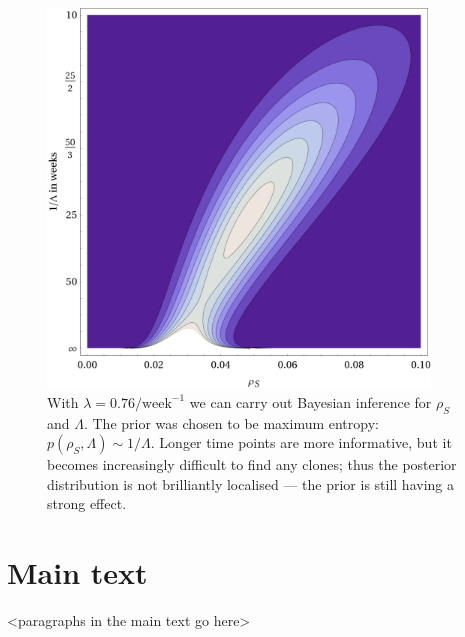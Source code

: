 \documentclass[10pt,UKenglish]{article}
\begin{document}
\begin{figure}[htb]
	\centering
	\includegraphics[width=4in]{single-cell-inference.png}
	\caption{\label{fig:single-cell-inference}With $\lambda=0.76/\textrm{week}^{-1}$ we can carry out Bayesian inference for $\rho_S$ and $\Lambda$. The prior was chosen to be maximum entropy: $p(\rho_S, \Lambda) \sim 1/\Lambda$. Longer time points are more informative, but it becomes increasingly difficult to find any clones; thus the posterior distribution is not brilliantly localised --- the prior is still having a strong effect.}
\end{figure}

\section{Main text}

<paragraphs in the main text go here>
\end{document}
